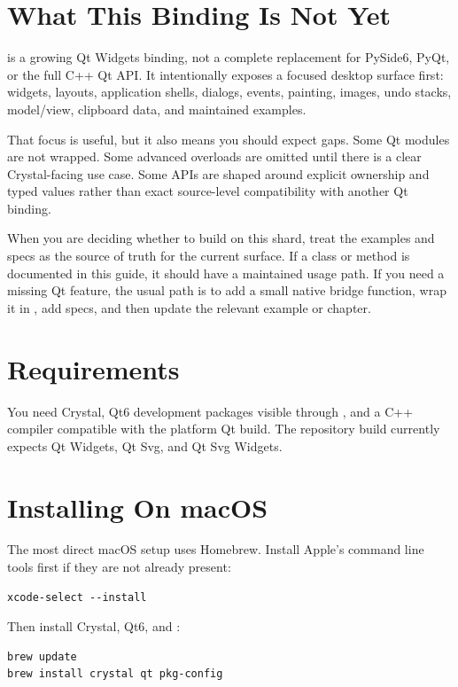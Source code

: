 \section{What This Binding Is Not Yet}

 is a growing Qt Widgets binding, not a complete replacement for PySide6, PyQt, or the full C++ Qt API. It intentionally exposes a focused desktop surface first: widgets, layouts, application shells, dialogs, events, painting, images, undo stacks, model/view, clipboard data, and maintained examples.

That focus is useful, but it also means you should expect gaps. Some Qt modules are not wrapped. Some advanced overloads are omitted until there is a clear Crystal-facing use case. Some APIs are shaped around explicit ownership and typed values rather than exact source-level compatibility with another Qt binding.

When you are deciding whether to build on this shard, treat the examples and specs as the source of truth for the current surface. If a class or method is documented in this guide, it should have a maintained usage path. If you need a missing Qt feature, the usual path is to add a small native bridge function, wrap it in , add specs, and then update the relevant example or chapter.

\section{Requirements}

You need Crystal, Qt6 development packages visible through , and a C++ compiler compatible with the platform Qt build. The repository build currently expects Qt Widgets, Qt Svg, and Qt Svg Widgets.

\section{Installing On macOS}

The most direct macOS setup uses Homebrew. Install Apple's command line tools first if they are not already present:

\begin{lstlisting}[style=crystal]
xcode-select --install
\end{lstlisting}

Then install Crystal, Qt6, and :

\begin{lstlisting}[style=crystal]
brew update
brew install crystal qt pkg-config
\end{lstlisting}


